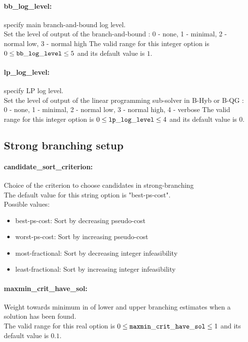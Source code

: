 \paragraph{bb\_log\_level:} specify main branch-and-bound log level. $\;$ \\
 Set the level of output of the branch-and-bound :
0 - none, 1 - minimal, 2 - normal low, 3 - normal
high The valid range for this integer option is
$0 \le {\tt bb\_log\_level } \le 5$
and its default value is $1$.


\paragraph{lp\_log\_level:} specify LP log level. $\;$ \\
 Set the level of output of the linear programming
sub-solver in B-Hyb or B-QG : 0 - none, 1 -
minimal, 2 - normal low, 3 - normal high, 4 -
verbose The valid range for this integer option is
$0 \le {\tt lp\_log\_level } \le 4$
and its default value is $0$.


\subsection{Strong branching setup}
\label{sec:Strong_branching_setup}
\paragraph{candidate\_sort\_criterion:} Choice of the criterion to choose candidates in strong-branching $\;$ \\

The default value for this string option is "best-ps-cost".
\\ 
Possible values:
\begin{itemize}
   \item best-ps-cost: Sort by decreasing pseudo-cost
   \item worst-ps-cost: Sort by increasing pseudo-cost
   \item most-fractional: Sort by decreasing integer infeasibility
   \item least-fractional: Sort by increasing integer infeasibility
\end{itemize}

\paragraph{maxmin\_crit\_have\_sol:} Weight towards minimum in of lower and upper branching estimates when a solution has been found. $\;$ \\
 The valid range for this real option is 
$0 \le {\tt maxmin\_crit\_have\_sol } \le 1$
and its default value is $0.1$.


